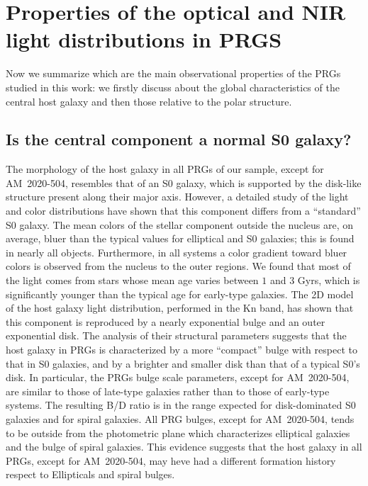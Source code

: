 \documentclass{aa}
\begin{document}
\section{Properties of the optical and NIR light distributions 
in PRGS}\label{sum}
Now we summarize which are the main observational properties of the PRGs  
studied in this work: we firstly discuss about the global characteristics
of the central host galaxy and then those relative to the polar structure.

\subsection{Is the central component a normal S0 galaxy?}
The morphology of the host galaxy in all PRGs of our sample, except for 
AM~2020-504, resembles that of an S0 galaxy, which is supported  by the
disk-like structure present along their major axis.
However, a detailed study of the light and color distributions
have shown that this component differs from a ``standard'' S0 galaxy.
The mean colors of the stellar
component outside the nucleus are, on average, bluer than the typical
values for elliptical and S0 galaxies; this is found in nearly all
objects.
Furthermore, in all systems a color gradient toward bluer colors is observed
from the nucleus to the outer regions. 
We found that most of the light comes from stars whose mean
age varies between $1$ and $3$ Gyrs, which is
significantly younger than the typical age for early-type galaxies.
The 2D model of the host galaxy light distribution, performed in the Kn band,
has shown that this component is reproduced by a nearly exponential
bulge and an outer exponential disk.
The analysis of their structural parameters suggests that
the host galaxy in PRGs is characterized by a more ``compact''  bulge
with respect to that in S0 galaxies, and by a brighter and smaller disk
than that of a typical S0's disk. In particular,
the PRGs bulge scale parameters, except for AM~2020-504, are similar to 
those of late-type galaxies rather than to those of early-type systems.
The resulting B/D ratio is in the range expected for disk-dominated S0 galaxies
and for spiral galaxies.
All PRG bulges, except for AM~2020-504, tends to be outside from 
the photometric plane which characterizes elliptical galaxies and the bulge of 
spiral galaxies. This evidence suggests that the host galaxy in 
all PRGs, except for AM~2020-504, may heve had a different formation history 
respect to Ellipticals and spiral bulges.
\end{document}
